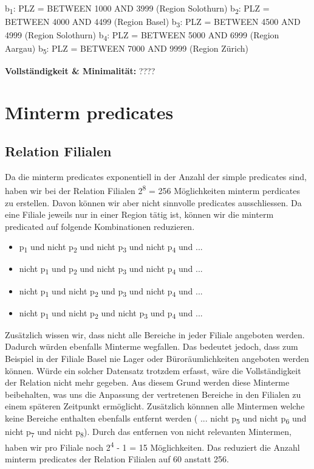 \documentclass[11pt,a4paper,parskip=half]{scrartcl}
\begin{document}
b\textsubscript{1}: PLZ = BETWEEN 1000 AND 3999 (Region Solothurn)\newline
b\textsubscript{2}: PLZ = BETWEEN 4000 AND 4499 (Region Basel)\newline
b\textsubscript{3}: PLZ = BETWEEN 4500 AND 4999 (Region Solothurn)\newline
b\textsubscript{4}: PLZ = BETWEEN 5000 AND 6999 (Region Aargau)\newline
b\textsubscript{5}: PLZ = BETWEEN 7000 AND 9999 (Region Zürich)\newline

\textbf{Vollständigkeit \& Minimalität: } ????

\section{Minterm predicates}
\subsection{Relation Filialen}
Da die minterm predicates exponentiell in der Anzahl der simple predicates sind, haben wir bei der Relation Filialen 2\textsuperscript{8} = 256 Möglichkeiten minterm perdicates zu erstellen. Davon können wir aber nicht sinnvolle predicates ausschliessen. Da eine Filiale jeweils nur in einer Region tätig ist, können wir die minterm predicated auf folgende Kombinationen reduzieren.
\begin{itemize}
	\item{p\textsubscript{1} und nicht p\textsubscript{2} und nicht p\textsubscript{3} und nicht p\textsubscript{4} und ...}
	\item{nicht p\textsubscript{1} und p\textsubscript{2} und nicht p\textsubscript{3} und nicht p\textsubscript{4} und ...}
	\item{nicht p\textsubscript{1} und nicht p\textsubscript{2} und p\textsubscript{3} und nicht p\textsubscript{4} und ...}
	\item{nicht p\textsubscript{1} und nicht p\textsubscript{2} und nicht p\textsubscript{3} und p\textsubscript{4} und ...}
\end{itemize}

Zusätzlich wissen wir, dass nicht alle Bereiche in jeder Filiale angeboten werden. Dadurch würden ebenfalls Minterme wegfallen. Das bedeutet jedoch, dass zum Beispiel in der Filiale Basel nie Lager oder Büroräumlichkeiten angeboten werden können. Würde ein solcher Datensatz trotzdem erfasst, wäre die Vollständigkeit der Relation nicht mehr gegeben. Aus diesem Grund werden diese Minterme beibehalten, was uns die Anpassung der vertretenen Bereiche in den Filialen zu einem späteren Zeitpunkt ermöglicht. Zusätzlich könnnen alle Mintermen welche keine Bereiche enthalten ebenfalls entfernt werden ( ... nicht p\textsubscript{5} und nicht p\textsubscript{6} und nicht p\textsubscript{7} und nicht p\textsubscript{8}).\newline
Durch das entfernen von nicht relevanten Mintermen, haben wir pro Filiale noch 2\textsuperscript{4} - 1 = 15 Möglichkeiten. Das reduziert die Anzahl minterm predicates der Relation Filialen auf 60 anstatt 256.\newline
\end{document}
